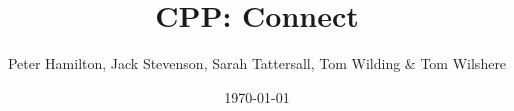 \title{CPP: Connect}
\author{Peter Hamilton, Jack Stevenson, Sarah Tattersall, Tom Wilding \& Tom Wilshere}
\date{\today}         %
